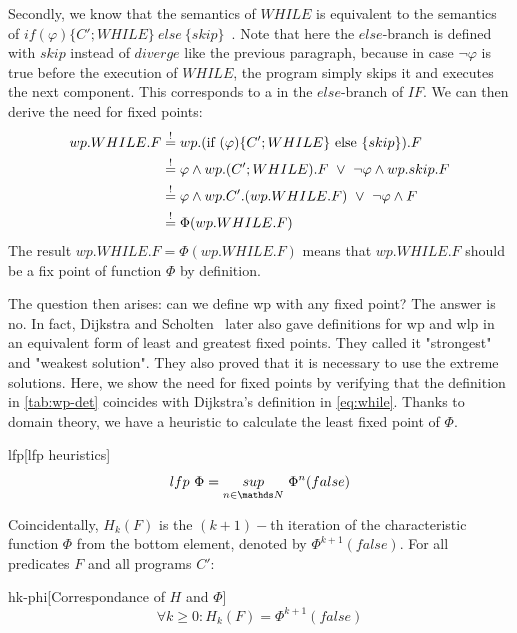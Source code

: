 Secondly, we know that the semantics of $WHILE$ is equivalent to the semantics of $if(\varphi)\{C';WHILE\}\ else\ \{skip\}$~\cite{lukkien1994OperationalSemanticsGeneralized}. 
Note that here the $else$-branch is defined with $skip$ instead of $diverge$ like the previous paragraph, because in case $\neg\varphi$ is true before the execution of $WHILE$, the program simply skips it and executes the next component. 
This corresponds to a  in the $else$-branch of $IF$. 
We can then derive the need for fixed points: 
\begin{align*} 
  wp.WHILE.F    & \seq wp.(\text{if }(\varphi)\{C';WHILE\}\text{ else }\{skip\}).F \\
                & \seq \varphi\wedge wp.(C';WHILE).F \ \vee \ \neg\varphi\wedge wp.skip.F\\ 
                & \seq \varphi\wedge wp.C'.(wp.WHILE.F)\ \vee\ \neg\varphi\wedge F\\ 
                & \seq \Phi(wp.WHILE.F)\\ 
\end{align*}
The result $wp.WHILE.F = \Phi(wp.WHILE.F)$ means that $wp.WHILE.F$ should be a fix point of function $\Phi$ by definition.

The question then arises: can we define wp with any fixed point? 
The answer is no. 
In fact, Dijkstra and Scholten~\cite{dijkstra90} later also gave definitions for wp and wlp in an equivalent form of least and greatest fixed points. 
They called it "strongest" and "weakest solution". 
They also proved that it is necessary to use the extreme solutions.
Here, we show the need for  fixed points by verifying that the definition in \autoref{tab:wp-det} coincides with Dijkstra's definition in \autoref{eq:while}.
Thanks to domain theory, we have a heuristic to calculate the least fixed point of $\Phi$. 

\begin{theorem}{lfp}[lfp heuristics]~{\normalfont\cite{kaminski19}}
$$lfp\ \Phi = \underset{n\in\N}{sup}\ \Phi^n(false)$$
\end{theorem}

Coincidentally, $H_k(F)$ is the $(k+1)-$th iteration of the characteristic function $\Phi$ from the bottom element, denoted by $\Phi^{k+1}(false)$. 
For all predicates $F$ and all programs $C'$: 
\begin{lemma}{hk-phi}[Correspondance of $H$ and $\Phi$]
$$\forall k\geq 0: H_k(F)=\Phi^{k+1}(false)$$
\end{lemma}

